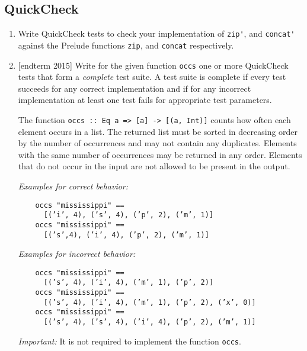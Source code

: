 \documentclass{article}
\begin{document}
\subsection{QuickCheck}
\begin{enumerate}
\item Write QuickCheck tests to check your implementation of \verb|zip'|, and \verb|concat'| against the Prelude functions \verb|zip|, and \verb|concat| respectively.

\item {[endterm 2015]} Write for the given function \verb|occs| one or more QuickCheck tests that form a \textit{complete} test suite. A test suite is complete if every test succeeds for any correct implementation and if for any incorrect implementation at least one test fails for appropriate test parameters. \par
The function \verb|occs :: Eq a => [a] -> [(a, Int)]| counts how often each element occurs in a list. The returned list must be sorted in decreasing order by the number of occurrences and may not contain any duplicates. Elements with the same number of occurrences may be returned in any order. Elements that do not occur in the input are not allowed to be present in the output. \par
\textit{Examples for correct behavior:}
\begin{verbatim}
    occs "mississippi" ==
      [(’i’, 4), (’s’, 4), (’p’, 2), (’m’, 1)]
    occs "mississippi" ==
      [(’s’,4), (’i’, 4), (’p’, 2), (’m’, 1)]
\end{verbatim}
\textit{Examples for incorrect behavior:}
\begin{verbatim}
    occs "mississippi" ==
      [(’s’, 4), (’i’, 4), (’m’, 1), (’p’, 2)]
    occs "mississippi" ==
      [(’s’, 4), (’i’, 4), (’m’, 1), (’p’, 2), (’x’, 0)]
    occs "mississippi" ==
      [(’s’, 4), (’s’, 4), (’i’, 4), (’p’, 2), (’m’, 1)]
\end{verbatim}
\textit{Important:} It is not required to implement the function \verb|occs|.
\end{enumerate}
\end{document}
